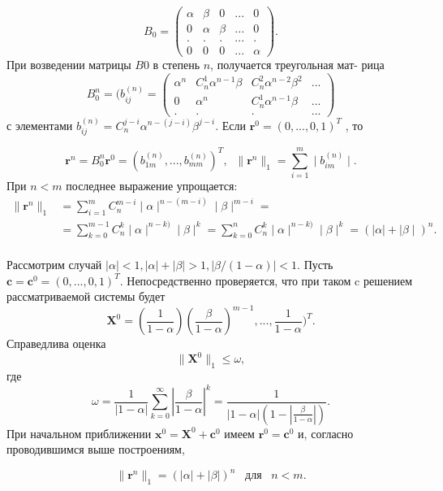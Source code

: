 \documentclass[a4paper, twoside, 12pt]{article}
\begin{document}
\[
B_{0} = 
\left(
\begin{array}{ccccc}
\alpha & \beta & 0 & ... & 0 \\
0 & \alpha & \beta & ... & 0 \\
. & . & . & ... & .\\
0 & 0  & 0 & ...& \alpha
\end{array}
\right)
.
\]
При возведении матрицы $B0$ в степень $n$, получается треугольная мат-
рица
\[
B_{0}^n=(b_{ij}^{(n)}=
\left(
\begin{array}{cccc}
\alpha^n & C_{n}^1\alpha^{n-1}\beta  & C_{n}^2\alpha^{n-2}\beta^2  & ...  \\
0 & \alpha^n & C_{n}^1\alpha^{n-1}\beta  & ... \\
. & .   & . & ... 
\end{array}
\right)
\]
с элементами $b_{ij}^{(n)} = C_{n}^{j-i}\alpha^{n-(j-i)}\beta^{j-i}$. Если $\textbf{r}^0 = (0, ..., 0, 1)^T$ , то

\[
\textbf{r}^n = B_{0}^n\textbf{r}^0 = (b_{1m}^{(n)}, ..., b_{mm}^{(n)})^T, \; \;
\|\textbf{r}^n\|_{1} = \sum\limits_{i=1}^{m}\mid b_{im}^{(n)}\mid.
\]
\indent При $n < m $ последнее выражение упрощается:
\[
\begin{split}
\|\textbf{r}^n\|_{1} &= \sum\limits_{i=1}^{m} C_{n}^{m-i}\mid\alpha\mid^{n-(m-i)}\mid\beta\mid^{m-i} 
= \\
&=
 \sum\limits_{k=0}^{m-1} C_{n}^{k}\mid\alpha\mid^{n-k)}\mid\beta\mid^{k} = 
\sum\limits_{k=0}^{n} C_{n}^{k}\mid\alpha\mid^{n-k)}\mid\beta\mid^{k} = \left(\left|\alpha\right| + \mid\beta\mid\right)^n.
\end{split}
\]
\\
Рассмотрим случай $\left|\alpha\right| < 1, \left|\alpha\right|
+ \left|\beta\right| > 1, \left|\beta/(1-\alpha)\right| < 1.$ Пусть $\textbf{c} = \textbf{c}^0=(0,..., 0, 1)^T$. Непосредственно проверяется, что при таком c решением рассматриваемой системы будет
\[
\textbf{X}^0 = \left(\frac{1}{1- \alpha}\right)
\left( \frac{\beta}{1-\alpha}\right)^{m-1}, ..., \frac{1}{1-\alpha})^T.
\]
Справедлива оценка
\[
\|\textbf{X}^0\|_{1} \leqslant \omega,
\]
где 
\[
\omega = \frac{1}{\left|1 - \alpha \right|} 
\sum\limits_{k=0}^{\infty} \left|\frac{\beta}{1-\alpha} \right| ^k = \frac{1}{\left| 1- \alpha\right| \left( 1 - \left| \frac{\beta}{1-\alpha}\right| \right)} .
\]
\indent
При начальном приближении $\textbf{x}^0 = \textbf{X}^0 + \textbf{c}^0$ имеем $\textbf{r}^0 = \textbf{c}^0$ и, согласно
проводившимся выше построениям,

\[
\|\textbf{r}^n \|_{1} = (\left|\alpha \right| + \left|\beta \right| )^n \; \; \; \text{для} \; \; \; n < m.
\]
\end{document}
